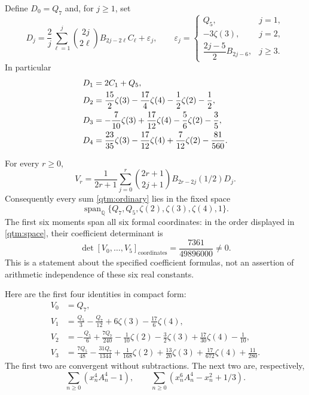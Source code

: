 Define $D_0=Q_7$ and, for $j\ge1$, set
\begin{equation}\label{qtm:Dj}
 \boxed{\displaystyle
 D_j=\frac2j\sum_{\ell=1}^{j}
 \binom{2j}{2\ell}B_{2j-2\ell}C_\ell+\varepsilon_j,\qquad
 \varepsilon_j=
 \begin{cases}
 Q_5,&j=1,\\
 -3\zeta(3),&j=2,\\
 \dfrac{2j-5}{2}B_{2j-6},&j\ge3.
 \end{cases}}
\end{equation}
In particular
\begin{align}
 D_1&=2C_1+Q_5,\notag\\
 D_2&=\frac{15}{2}\zeta(3)-\frac{17}{4}\zeta(4)
                 -\frac12\zeta(2)-\frac12,\notag\\
 D_3&=-\frac7{10}\zeta(3)+\frac{17}{12}\zeta(4)
                 -\frac56\zeta(2)-\frac35,\notag\\
 D_4&=\frac{23}{35}\zeta(3)-\frac{17}{12}\zeta(4)
                 +\frac7{12}\zeta(2)-\frac{81}{560}.
 \label{qtm:Dexamples}
\end{align}

\begin{theorem}
\label{qtm:main}
For every $r\ge0$,
\begin{equation}\label{qtm:mainformula}
 \boxed{\displaystyle
 V_r=\frac1{2r+1}\sum_{j=0}^{r}
 \binom{2r+1}{2j+1}B_{2r-2j}(1/2)D_j.}
\end{equation}
Consequently every sum \eqref{qtm:ordinary} lies in the fixed space
\begin{equation}\label{qtm:space}
 \operatorname{span}_{\mathbb Q}
 \{Q_7,Q_5,\zeta(2),\zeta(3),\zeta(4),1\}.
\end{equation}
The first six moments span all six formal coordinates: in the order
displayed in \eqref{qtm:space}, their coefficient determinant is
\begin{equation}\label{qtm:det}
 \det [V_0,\ldots,V_5]_{\mathrm{coordinates}}
       =\frac{7361}{49896000}\ne0.
\end{equation}
This is a statement about the specified coefficient formulas, not an
assertion of arithmetic independence of these six real constants.
\end{theorem}

Here are the first four identities in compact form:
\begin{align}
 V_0&=Q_7,\label{qtm:V0}\\
 V_1&=\frac{Q_5}{3}-\frac{Q_7}{12}
                +6\zeta(3)-\frac{17}{6}\zeta(4),\label{qtm:V1}\\
 V_2&=-\frac{Q_5}{6}+\frac{7Q_7}{240}-\frac1{10}\zeta(2)
        -\frac32\zeta(3)+\frac{17}{30}\zeta(4)-\frac1{10},
        \label{qtm:V2}\\
 V_3&=\frac{7Q_5}{48}-\frac{31Q_7}{1344}+\frac1{168}\zeta(2)
        +\frac{13}{20}\zeta(3)+\frac{17}{672}\zeta(4)
        +\frac{11}{280}.\label{qtm:V3}
\end{align}
The first two are convergent without subtractions.  The next two are,
respectively,
\[
 \sum_{n\ge0}(x_n^4A_n^4-1),\qquad
 \sum_{n\ge0}(x_n^6A_n^4-x_n^2+1/3).
\]

